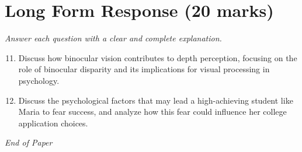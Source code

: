 \documentclass[12pt]{article}
\begin{document}
\section*{Long Form Response (20 marks)}
\textit{Answer each question with a clear and complete explanation.}
\begin{enumerate}[label=\arabic*.]
\setcounter{enumi}{10}
\item Discuss how binocular vision contributes to depth perception, focusing on the role of binocular disparity and its implications for visual processing in psychology.
\item Discuss the psychological factors that may lead a high-achieving student like Maria to fear success, and analyze how this fear could influence her college application choices.
\end{enumerate}

\vfill
\noindent\textit{End of Paper}
\end{document}
